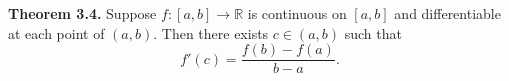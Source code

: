 \textbf{Theorem 3.4.}  Suppose $f: [a, b] \to \mathbb{R}$ is continuous on $[a, b]$ and differentiable at each point of $(a, b)$. Then there exists $c \in (a, b)$ such that
$$f'(c) = \frac{f(b) - f(a)}{b - a}.$$
